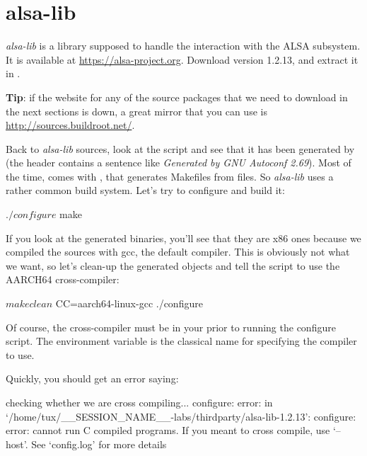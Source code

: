 \section{alsa-lib}

{\em alsa-lib} is a library supposed to handle the interaction with
the ALSA subsystem. It is available at \url{https://alsa-project.org}.
Download version 1.2.13, and extract it
in .

{\bf Tip}: if the website for any of the source packages that we
need to download in the next sections is down, a great mirror
that you can use is \url{http://sources.buildroot.net/}.

Back to {\em alsa-lib} sources, look at the  script
and see that it has been generated by  (the header
contains a sentence like {\em Generated by GNU Autoconf 2.69}). Most of
the time,  comes with , that generates
Makefiles from  files. So {\em alsa-lib} uses a rather
common build system. Let's try to configure and build it:

\begin{bashinput}
$ ./configure
$ make
\end{bashinput}

If you look at the generated binaries, you'll see that they are
x86 ones because we compiled the sources with gcc, the default compiler.
This is obviously not what we want, so let's clean-up the generated objects
and tell the  script to use the AARCH64 cross-compiler:

\begin{bashinput}
$ make clean
$ CC=aarch64-linux-gcc ./configure
\end{bashinput}

Of course, the  cross-compiler must be in your
 prior to running the configure script. The  environment
variable is the classical name for specifying the compiler to
use.

Quickly, you should get an error saying:

\begin{terminaloutput}
checking whether we are cross compiling... configure: error: in `/home/tux/__SESSION_NAME__-labs/thirdparty/alsa-lib-1.2.13':
configure: error: cannot run C compiled programs.
If you meant to cross compile, use `--host'.
See `config.log' for more details
\end{terminaloutput}
\normalsize


